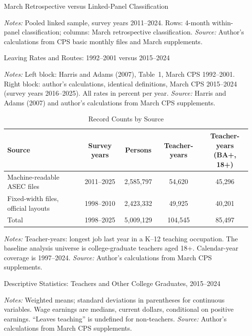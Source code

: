 \documentclass[11pt,a4paper]{article}
\newcommand{\fignote}[1]{\par\vspace{4pt}%
  \begin{minipage}{\linewidth}\footnotesize\color{ecgray}#1\end{minipage}}
\begin{document}
\begin{table}[H]
\centering\small
\caption{March Retrospective versus Linked-Panel Classification}

\fignote{\textit{Notes:} Pooled linked sample, survey years
2011--2024. Rows: 4-month within-panel classification; columns: March
retrospective classification. \textit{Source:} Author's calculations
from CPS basic monthly files and March supplements.}
\end{table}

\begin{table}[H]
\centering\small
\caption{Leaving Rates and Routes: 1992--2001 versus 2015--2024}

\fignote{\textit{Notes:} Left block: Harris and Adams (2007),
Table~1, March CPS 1992--2001. Right block: author's calculations,
identical definitions, March CPS 2015--2024 (survey years 2016--2025).
All rates in percent per year. \textit{Source:} Harris and Adams
(2007) and author's calculations from March CPS supplements.}
\end{table}

\begin{table}[H]
\centering\small
\caption{Record Counts by Source}
\begin{tabular}{lcccc}
\toprule
Source & Survey years & Persons & Teacher-years & \shortstack{Teacher-years\\(BA+, 18+)} \\
\midrule
Machine-readable ASEC files & 2011--2025 & 2,585,797 & 54,620 & 45,296 \\
Fixed-width files, official layouts & 1998--2010 & 2,423,332 & 49,925 & 40,201 \\
\midrule
Total & 1998--2025 & 5,009,129 & 104,545 & 85,497 \\
\bottomrule
\end{tabular}
\fignote{\textit{Notes:} Teacher-years: longest job last year in a
K--12 teaching occupation. The baseline analysis universe is
college-graduate teachers aged 18+. Calendar-year coverage is
1997--2024. \textit{Source:} Author's calculations from March CPS
supplements.}
\end{table}
\clearpage

\begin{table}[H]
\centering\footnotesize
\caption{Descriptive Statistics: Teachers and Other College Graduates,
2015--2024}

\fignote{\textit{Notes:} Weighted means; standard deviations in
parentheses for continuous variables. Wage earnings are medians,
current dollars, conditional on positive earnings. ``Leaves teaching''
is undefined for non-teachers. \textit{Source:} Author's calculations
from March CPS supplements.}
\end{table}
\end{document}
